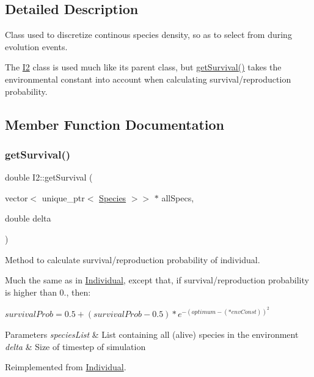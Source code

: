 \subsection{Detailed Description}
Class used to discretize continous species density, so as to select from during evolution events. 

The \hyperlink{classI2}{I2} class is used much like its parent class, but \hyperlink{classI2_ac747249e352a954b96a530537c60d3b1}{get\+Survival()} takes the environmental constant into account when calculating survival/reproduction probability. 

\subsection{Member Function Documentation}
\hypertarget{classI2_ac747249e352a954b96a530537c60d3b1}{}\label{classI2_ac747249e352a954b96a530537c60d3b1} 
\subsubsection{\texorpdfstring{get\+Survival()}{getSurvival()}}
{\footnotesize\ttfamily double I2\+::get\+Survival (\begin{DoxyParamCaption}\item[{vector$<$ unique\+\_\+ptr$<$ \hyperlink{classSpecies}{Species} $>$$>$ $\ast$}]{all\+Specs,  }\item[{double}]{delta }\end{DoxyParamCaption})\hspace{0.3cm}{\ttfamily [virtual]}}



Method to calculate survival/reproduction probability of individual. 

Much the same as in \hyperlink{classIndividual}{Individual}, except that, if survival/reproduction probability is higher than 0., then\+:

$survivalProb = 0.5 + (survivalProb - 0.5)*e^{-(optimum-(*envConst))^2}$


\begin{DoxyParams}{Parameters}
{\em species\+List} & List containing all (alive) species in the environment \\
\hline
{\em delta} & Size of timestep of simulation \\
\hline
\end{DoxyParams}


Reimplemented from \hyperlink{classIndividual_a895954f2c3a683dd3bd7475651a38160}{Individual}.



